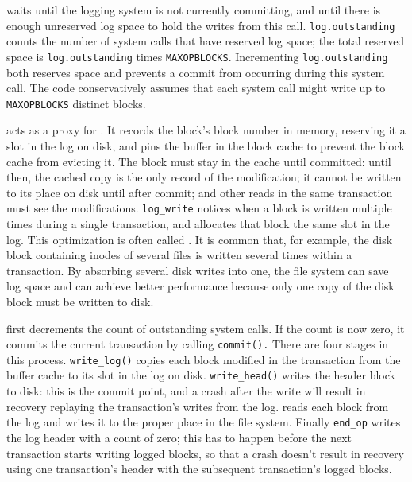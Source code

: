 waits until
the logging system is not currently committing, and until
there is enough unreserved log space to hold
the writes from this call.
\lstinline{log.outstanding}
counts the number of system calls that have reserved log
space; the total reserved space is 
\lstinline{log.outstanding}
times
\lstinline{MAXOPBLOCKS}.
Incrementing
\lstinline{log.outstanding}
both reserves space and prevents a commit
from occurring during this system call.
The code conservatively assumes that each system call might write up to
\lstinline{MAXOPBLOCKS}
distinct blocks.

acts as a proxy for 
.
It records the block's block number in memory,
reserving it a slot in the log on disk,
and pins the buffer in the block cache
to prevent the block cache from evicting it.
The block must stay in the cache until committed:
until then, the cached copy is the only record
of the modification; it cannot be written to
its place on disk until after commit;
and other reads in the same transaction must
see the modifications.
\lstinline{log_write}
notices when a block is written multiple times during a single
transaction, and allocates that block the same slot in the log.
This optimization is often called
.
It is common that, for example, the disk block containing inodes
of several files is written several times within a transaction.  By absorbing
several disk writes into one, the file system can save log space and
can achieve better performance because only one copy of the disk block must be
written to disk.

first decrements the count of outstanding system calls.
If the count is now zero, it commits the current
transaction by calling
\lstinline{commit().}
There are four stages in this process.
\lstinline{write_log()}
copies each block modified in the transaction from the buffer
cache to its slot in the log on disk.
\lstinline{write_head()}
writes the header block to disk: this is the
commit point, and a crash after the write will
result in recovery replaying the transaction's writes from the log.
reads each block from the log and writes it to the proper
place in the file system.
Finally
\lstinline{end_op}
writes the log header with a count of zero;
this has to happen before the next transaction starts writing
logged blocks, so that a crash doesn't result in recovery
using one transaction's header with the subsequent transaction's
logged blocks.

